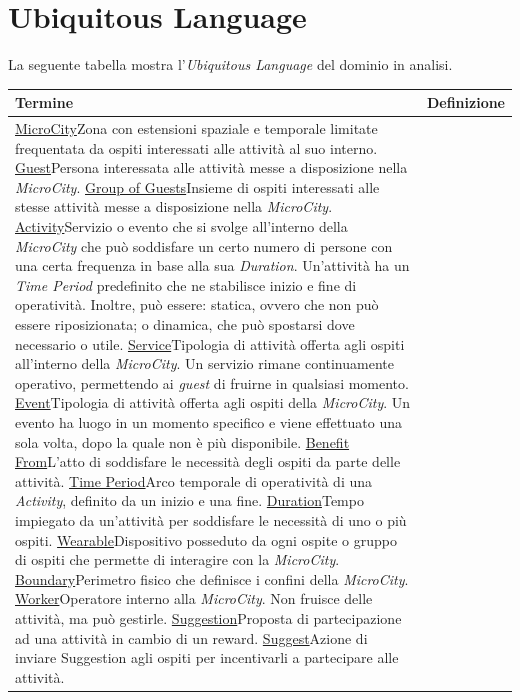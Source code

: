 \section{Ubiquitous Language}

La seguente tabella mostra l'\textit{Ubiquitous Language} del dominio in analisi.

\begin{table}[H]
    \centering
    \begin{tabular}{|l|p{}|}
        \hline
        \textbf{Termine} & \textbf{Definizione}\\
        \hline
        \ul{MicroCity}{Zona con estensioni spaziale e temporale limitate frequentata da ospiti interessati alle attività al suo interno.}
        \ul{Guest}{Persona interessata alle attività messe a disposizione nella \textit{MicroCity}.}
        \ul{Group of Guests}{Insieme di ospiti interessati alle stesse attività messe a disposizione nella \textit{MicroCity}.}
        \ul{Activity}{Servizio o evento che si svolge all'interno della \textit{MicroCity} che può soddisfare un certo numero di persone con una certa frequenza in base alla sua \textit{Duration}. Un'attività ha un \textit{Time Period} predefinito che ne stabilisce inizio e fine di operatività. Inoltre, può essere: statica, ovvero che non può essere riposizionata; o dinamica, che può spostarsi dove necessario o utile.}
        \ul{Service}{Tipologia di attività offerta agli ospiti all'interno della \textit{MicroCity}. Un servizio rimane continuamente operativo, permettendo ai \textit{guest} di fruirne in qualsiasi momento.}
        \ul{Event}{Tipologia di attività offerta agli ospiti della \textit{MicroCity}. Un evento ha luogo in un momento specifico e viene effettuato una sola volta, dopo la quale non è più disponibile.}
        \ul{Benefit From}{L'atto di soddisfare le necessità degli ospiti da parte delle attività.}
        \ul{Time Period}{Arco temporale di operatività di una \textit{Activity}, definito da un inizio e una fine.}
        \ul{Duration}{Tempo impiegato da un'attività per soddisfare le necessità di uno o più ospiti.}
        \ul{Wearable}{Dispositivo posseduto da ogni ospite o gruppo di ospiti che permette di interagire con la \textit{MicroCity}.}
        \ul{Boundary}{Perimetro fisico che definisce i confini della \textit{MicroCity}.}
        \ul{Worker}{Operatore interno alla \textit{MicroCity}. Non fruisce delle attività, ma può gestirle.}
        \ul{Suggestion}{Proposta di partecipazione ad una attività in cambio di un reward.}
        \ul{Suggest}{Azione di inviare Suggestion agli ospiti per incentivarli a partecipare alle attività.}

\end{tabular}
\end{table}
